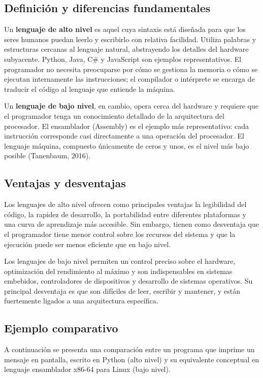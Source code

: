 \documentclass[12pt,a4paper]{article}
\begin{document}
	\subsection{Definición y diferencias fundamentales}
	
	Un \textbf{lenguaje de alto nivel} es aquel cuya sintaxis está diseñada para que los seres humanos puedan leerlo y escribirlo con relativa facilidad. Utiliza palabras y estructuras cercanas al lenguaje natural, abstrayendo los detalles del hardware subyacente. Python, Java, C\# y JavaScript son ejemplos representativos. El programador no necesita preocuparse por cómo se gestiona la memoria o cómo se ejecutan internamente las instrucciones; el compilador o intérprete se encarga de traducir el código al lenguaje que entiende la máquina.
	
	Un \textbf{lenguaje de bajo nivel}, en cambio, opera cerca del hardware y requiere que el programador tenga un conocimiento detallado de la arquitectura del procesador. El ensamblador (Assembly) es el ejemplo más representativo: cada instrucción corresponde casi directamente a una operación del procesador. El lenguaje máquina, compuesto únicamente de ceros y unos, es el nivel más bajo posible (Tanenbaum, 2016).
	
	\subsection{Ventajas y desventajas}
	
	Los lenguajes de alto nivel ofrecen como principales ventajas la legibilidad del código, la rapidez de desarrollo, la portabilidad entre diferentes plataformas y una curva de aprendizaje más accesible. Sin embargo, tienen como desventaja que el programador tiene menor control sobre los recursos del sistema y que la ejecución puede ser menos eficiente que en bajo nivel.
	
	Los lenguajes de bajo nivel permiten un control preciso sobre el hardware, optimización del rendimiento al máximo y son indispensables en sistemas embebidos, controladores de dispositivos y desarrollo de sistemas operativos. Su principal desventaja es que son difíciles de leer, escribir y mantener, y están fuertemente ligados a una arquitectura específica.
	
	\subsection{Ejemplo comparativo}
	
	A continuación se presenta una comparación entre un programa que imprime un mensaje en pantalla, escrito en Python (alto nivel) y su equivalente conceptual en lenguaje ensamblador x86-64 para Linux (bajo nivel).
	
\end{document}
